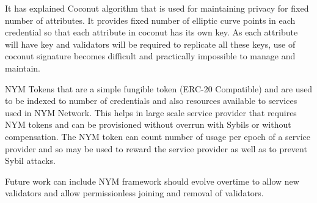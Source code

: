     \par It has explained Coconut algorithm that is used for maintaining privacy for fixed number of attributes. It provides fixed number of elliptic curve points in each credential so that each attribute in coconut has its own key. As each attribute will have key and validators will be required to replicate all these keys, use of coconut signature becomes difficult and practically impossible to manage and maintain.
    \par NYM Tokens that are a simple fungible token (ERC-20 Compatible) and are used to be indexed to number of credentials and also resources available to services used in NYM Network. This helps in large scale service provider that requires NYM tokens and can be provisioned without overrun with Sybils or without compensation. The NYM token can count number of usage per epoch of a service provider and so may be used to reward the service provider as well as to prevent Sybil attacks. 
    \par Future work can include NYM framework should evolve overtime to allow new validators and allow permissionless joining and removal of validators.
    